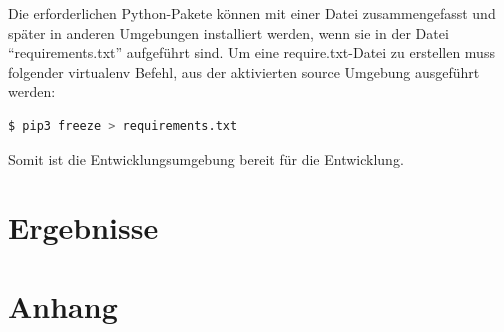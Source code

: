 \documentclass[
        ngerman,
        paper=a4,
        numbers=noendperiod,
]{scrreprt}
\begin{document}
Die erforderlichen Python-Pakete können mit einer Datei zusammengefasst und später in anderen Umgebungen installiert werden, wenn sie in der Datei \enquote{requirements.txt} aufgeführt sind. Um eine require.txt-Datei zu erstellen muss folgender virtualenv Befehl, aus der aktivierten source Umgebung ausgeführt werden:

\begin{lstlisting}[language=bash, caption=Erstellen der requirements.txt Datei]
$ pip3 freeze > requirements.txt
\end{lstlisting}

Somit ist die Entwicklungsumgebung bereit für die Entwicklung.



\chapter{Ergebnisse}




\appendix 
\chapter{Anhang}
\label{chapter:Anhang}%


\clearpage
        
        
        
\end{document}
